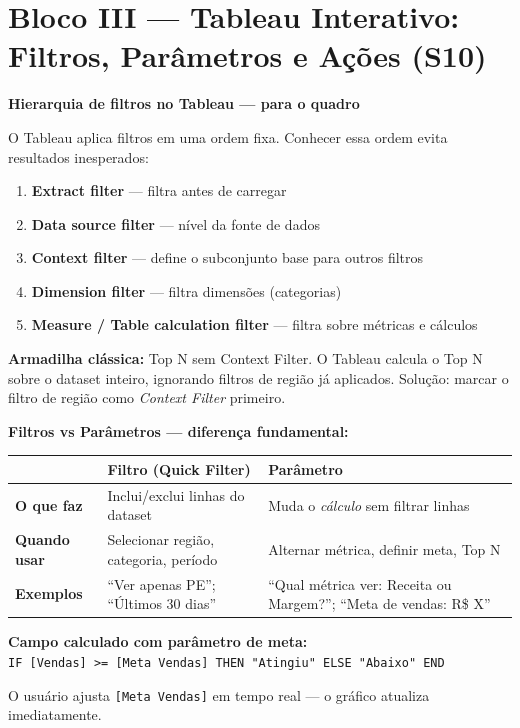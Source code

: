 \section{Bloco III — Tableau Interativo: Filtros, Parâmetros e Ações (S10)}

\begin{BoardBox}
\textbf{Hierarquia de filtros no Tableau — para o quadro}

O Tableau aplica filtros em uma ordem fixa. Conhecer essa ordem evita resultados
inesperados:
\begin{enumerate}
  \item \textbf{Extract filter} — filtra antes de carregar
  \item \textbf{Data source filter} — nível da fonte de dados
  \item \textbf{Context filter} — define o subconjunto base para outros filtros
  \item \textbf{Dimension filter} — filtra dimensões (categorias)
  \item \textbf{Measure / Table calculation filter} — filtra sobre métricas e cálculos
\end{enumerate}

\textbf{Armadilha clássica:} Top N sem Context Filter. O Tableau calcula o Top N sobre
o dataset inteiro, ignorando filtros de região já aplicados. Solução: marcar o filtro de
região como \textit{Context Filter} primeiro.
\end{BoardBox}

\begin{SolvedBox}
\textbf{Filtros vs Parâmetros — diferença fundamental:}

\begin{tabular}{|l|p{5cm}|p{5.5cm}|}
\hline
 & \textbf{Filtro (Quick Filter)} & \textbf{Parâmetro} \\
\hline
\textbf{O que faz} & Inclui/exclui linhas do dataset & Muda o \emph{cálculo} sem filtrar linhas \\
\textbf{Quando usar} & Selecionar região, categoria, período & Alternar métrica, definir meta, Top N \\
\textbf{Exemplos} & ``Ver apenas PE''; ``Últimos 30 dias'' &
``Qual métrica ver: Receita ou Margem?''; ``Meta de vendas: R\$ X'' \\
\hline
\end{tabular}

\textbf{Campo calculado com parâmetro de meta:}\\
\texttt{IF [Vendas] >= [Meta Vendas] THEN "Atingiu" ELSE "Abaixo" END}

O usuário ajusta \texttt{[Meta Vendas]} em tempo real — o gráfico atualiza imediatamente.
\end{SolvedBox}


